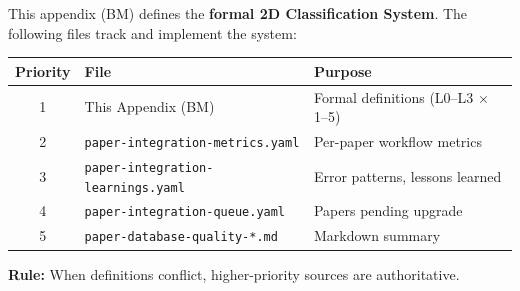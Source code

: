 
\begin{tcolorbox}[colback=red!5!white, colframe=red!75!black,
    title=\textbf{SSOT: Single Source of Truth Hierarchy}]

This appendix (BM) defines the \textbf{formal 2D Classification System}.
The following files track and implement the system:

\begin{table}[H]
\centering
\begin{tabular}{@{}clp{6cm}@{}}
\toprule
\textbf{Priority} & \textbf{File} & \textbf{Purpose} \\
\midrule
1 & This Appendix (BM) & Formal definitions (L0--L3 $\times$ 1--5) \\
2 & \texttt{paper-integration-metrics.yaml} & Per-paper workflow metrics \\
3 & \texttt{paper-integration-learnings.yaml} & Error patterns, lessons learned \\
4 & \texttt{paper-integration-queue.yaml} & Papers pending upgrade \\
5 & \texttt{paper-database-quality-*.md} & Markdown summary \\
\bottomrule
\end{tabular}
\end{table}

\textbf{Rule:} When definitions conflict, higher-priority sources are authoritative.

\end{tcolorbox}


